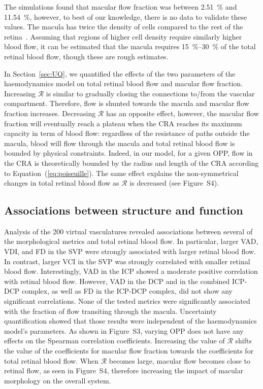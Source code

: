 \documentclass[11pt,]{article}
\begin{document}
The simulations found that macular flow fraction was between \SI{2.51}{\percent} and \SI{11.54}{\percent}, however, to best of our knowledge, there is no data to validate these values.
The macula has twice the density of cells compared to the rest of the retina~\cite{Zouache2022}.
Assuming that regions of higher cell density require similarly higher blood flow, it can be estimated that the macula requires \SIrange{15}{30}{\percent} of the total retinal blood flow, though these are rough estimates.

In Section~\ref{sec:UQ}, we quantified the effects of the two parameters of the haemodynamics model on total retinal blood flow and macular flow fraction.
Increasing $\mathcal R$ is similar to gradually closing the connections to/from the vascular compartment.
Therefore, flow is shunted towards the macula and macular flow fraction increases.
Decreasing $\mathcal R$ has an opposite effect, however, the macular flow fraction will eventually reach a plateau when the CRA reaches its maximum capacity in term of blood flow: regardless of the resistance of paths outside the macula, blood will flow through the macula and total retinal blood flow is bounded by physical constraints.
Indeed, in our model, for a given OPP, flow in the CRA is theoretically bounded by the radius and length of the CRA according to Equation~(\ref{eq:poiseuille}).
The same effect explains the non-symmetrical changes in total retinal blood flow as $\mathcal R$ is decreased (see Figure~S4). %

\subsection{Associations between structure and function}\label{sec:disc-results}

Analysis of the \SI{200}{} virtual vasculatures revealed associations between several of the morphological metrics and total retinal blood flow.
In particular, larger VAD, VDI, and FD in the SVP were strongly associated with larger retinal blood flow.
In contrast, larger VCI in the SVP was strongly correlated with smaller retinal blood flow.
Interestingly, VAD in the ICP showed a moderate positive correlation with retinal blood flow.
However, VAD in the DCP and in the combined ICP-DCP complex, as well as FD in the ICP-DCP complex, did not show any significant correlations.
None of the tested metrics were significantly associated with the fraction of flow transiting through the macula.
Uncertainty quantification showed that those results were independent of the haemodynamics model's parameters.
As shown in Figure~S3, varying OPP does not have any effects on the Spearman correlation coefficients.
Increasing the value of $\mathcal R$ shifts the value of the coefficients for macular flow fraction towards the coefficients for total retinal blood flow.
When $\mathcal R$ becomes large, macular flow becomes close to retinal flow, as seen in Figure~S4, therefore increasing the impact of macular morphology on the overall system. 
\end{document}
